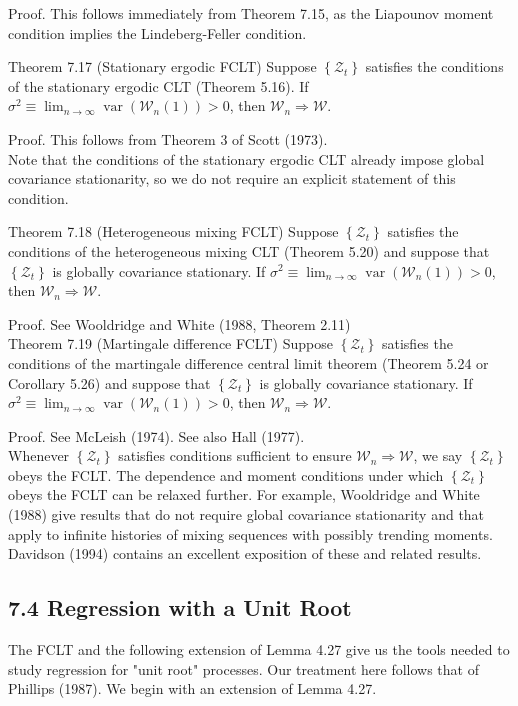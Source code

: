 \documentclass[10pt]{article}
\begin{document}
Proof. This follows immediately from Theorem 7.15, as the Liapounov moment condition implies the Lindeberg-Feller condition.

Theorem 7.17 (Stationary ergodic FCLT) Suppose $\left\{\mathcal{Z}_{t}\right\}$ satisfies the conditions of the stationary ergodic CLT (Theorem 5.16). If $\sigma^{2} \equiv \lim _{n \rightarrow \infty} \operatorname{var}\left(\mathcal{W}_{n}(1)\right)>0$, then $\mathcal{W}_{n} \Rightarrow \mathcal{W}$.

Proof. This follows from Theorem 3 of Scott (1973).\\
Note that the conditions of the stationary ergodic CLT already impose global covariance stationarity, so we do not require an explicit statement of this condition.

Theorem 7.18 (Heterogeneous mixing FCLT) Suppose $\left\{\mathcal{Z}_{t}\right\}$ satisfies the conditions of the heterogeneous mixing CLT (Theorem 5.20) and suppose that $\left\{\mathcal{Z}_{t}\right\}$ is globally covariance stationary. If $\sigma^{2} \equiv \lim _{n \rightarrow \infty} \operatorname{var}\left(\mathcal{W}_{n}(1)\right) >0$, then $\mathcal{W}_{n} \Rightarrow \mathcal{W}$.

Proof. See Wooldridge and White (1988, Theorem 2.11)\\
Theorem 7.19 (Martingale difference FCLT) Suppose $\left\{\mathcal{Z}_{t}\right\}$ satisfies the conditions of the martingale difference central limit theorem (Theorem 5.24 or Corollary 5.26) and suppose that $\left\{\mathcal{Z}_{t}\right\}$ is globally covariance stationary. If $\sigma^{2} \equiv \lim _{n \rightarrow \infty} \operatorname{var}\left(\mathcal{W}_{n}(1)\right)>0$, then $\mathcal{W}_{n} \Rightarrow \mathcal{W}$.

Proof. See McLeish (1974). See also Hall (1977).\\
Whenever $\left\{\mathcal{Z}_{t}\right\}$ satisfies conditions sufficient to ensure $\mathcal{W}_{n} \Rightarrow \mathcal{W}$, we say $\left\{\mathcal{Z}_{t}\right\}$ obeys the FCLT. The dependence and moment conditions under which $\left\{\mathcal{Z}_{t}\right\}$ obeys the FCLT can be relaxed further. For example, Wooldridge and White (1988) give results that do not require global covariance stationarity and that apply to infinite histories of mixing sequences with possibly trending moments. Davidson (1994) contains an excellent exposition of these and related results.

\subsection*{7.4 Regression with a Unit Root}
The FCLT and the following extension of Lemma 4.27 give us the tools needed to study regression for "unit root" processes. Our treatment here follows that of Phillips (1987). We begin with an extension of Lemma 4.27.
\end{document}
